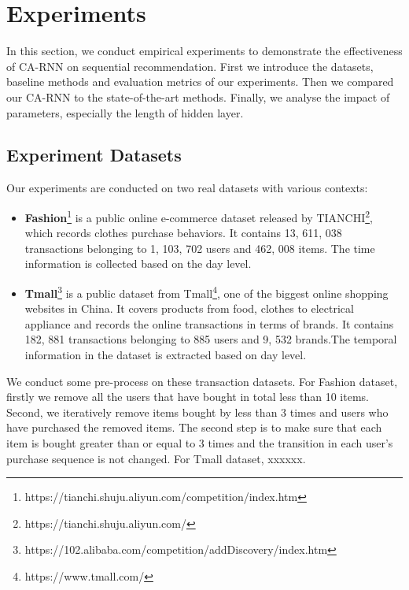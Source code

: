 \documentclass[conference]{IEEEtran}
\begin{document}
\section{Experiments}
In this section, we conduct empirical experiments to demonstrate the effectiveness of CA-RNN on sequential recommendation. First we introduce the datasets, baseline methods and evaluation metrics of our experiments. Then we compared our CA-RNN to the state-of-the-art methods. Finally, we analyse the impact of parameters, especially the length of hidden layer.
\subsection{Experiment Datasets}
Our experiments are conducted on two real datasets with various contexts:
\begin{itemize}
\item \textbf{Fashion}\footnote{https://tianchi.shuju.aliyun.com/competition/index.htm} is a public online e-commerce dataset released by TIANCHI\footnote{https://tianchi.shuju.aliyun.com/}, which records clothes purchase behaviors. It contains 13, 611, 038 transactions belonging to 1, 103, 702 users and 462, 008 items. The time information is collected based on the day level.

\item \textbf{Tmall}\footnote{https://102.alibaba.com/competition/addDiscovery/index.htm} is a public dataset from Tmall\footnote{https://www.tmall.com/}, one of the biggest online shopping websites in China. It covers products from food, clothes to electrical appliance and records the online transactions in terms of brands. It contains 182, 881 transactions belonging to 885 users and 9, 532 brands.The temporal information in the dataset is extracted based on day level.
\end{itemize}
We conduct some pre-process on these transaction datasets. For Fashion dataset, firstly we remove all the users that have bought in total less than 10 items. Second, we iteratively remove items bought by less than 3 times and users who have purchased the removed items. The second step is to make sure that each item is bought greater than or equal to 3 times and the transition in each user's purchase sequence is not changed. For Tmall dataset, xxxxxx.
\end{document}
